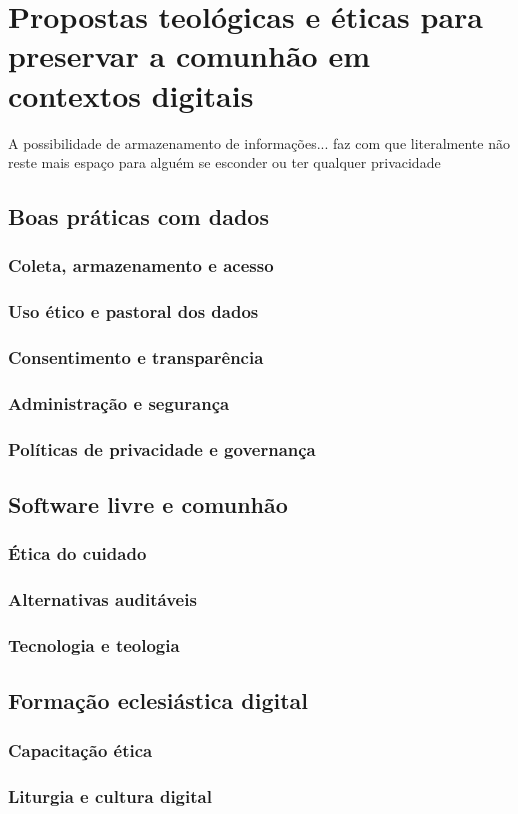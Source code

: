 \newpage
\chapter{Propostas teológicas e éticas para preservar a comunhão em contextos digitais}

\begin{citacao}
A possibilidade de armazenamento de informações... faz com que literalmente não reste mais espaço para alguém se esconder ou ter qualquer privacidade\cite[p. 165]{schaeffer2002}
\end{citacao}

\section{Boas práticas com dados}
\subsection{Coleta, armazenamento e acesso}

\subsection{Uso ético e pastoral dos dados}

\subsection{Consentimento e transparência}

\subsection{Administração e segurança}

\subsection{Políticas de privacidade e governança}

\section{Software livre e comunhão}
\subsection{Ética do cuidado}

\subsection{Alternativas auditáveis}

\subsection{Tecnologia e teologia}

\section{Formação eclesiástica digital}
\subsection{Capacitação ética}

\subsection{Liturgia e cultura digital}
